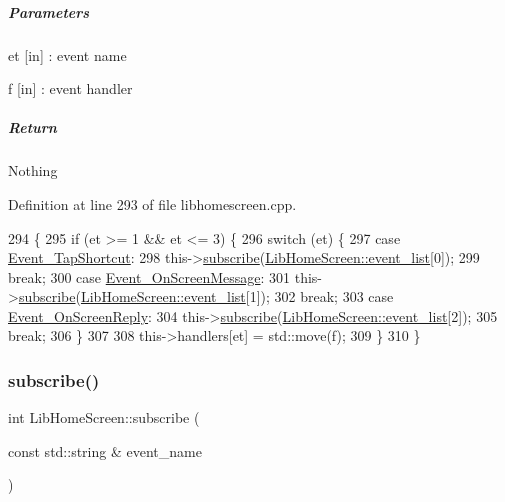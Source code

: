 \subparagraph*{Parameters}


\begin{DoxyItemize}
\item et \mbox{[}in\mbox{]} \+: event name
\item f \mbox{[}in\mbox{]} \+: event handler
\end{DoxyItemize}

\subparagraph*{Return}

Nothing 

Definition at line 293 of file libhomescreen.\+cpp.


\begin{DoxyCode}
294 \{
295     \textcolor{keywordflow}{if} (et >= 1 && et <= 3) \{
296         \textcolor{keywordflow}{switch} (et) \{
297             \textcolor{keywordflow}{case} \hyperlink{class_lib_home_screen_a82616c91ac211d2ad08e709b524bf154a4b0a82d501e4db5fbfe25c254c92896f}{Event\_TapShortcut}:
298                 this->\hyperlink{class_lib_home_screen_aa4c189807b75d070f567967f0d690738}{subscribe}(\hyperlink{class_lib_home_screen_a6a6d8a4d33a006a08652e7377a4c29e9}{LibHomeScreen::event\_list}[0]);
299                 \textcolor{keywordflow}{break};
300             \textcolor{keywordflow}{case} \hyperlink{class_lib_home_screen_a82616c91ac211d2ad08e709b524bf154aea56fa32a124a8ddcbea127755280a1d}{Event\_OnScreenMessage}:
301                 this->\hyperlink{class_lib_home_screen_aa4c189807b75d070f567967f0d690738}{subscribe}(\hyperlink{class_lib_home_screen_a6a6d8a4d33a006a08652e7377a4c29e9}{LibHomeScreen::event\_list}[1]);
302                 \textcolor{keywordflow}{break};
303             \textcolor{keywordflow}{case} \hyperlink{class_lib_home_screen_a82616c91ac211d2ad08e709b524bf154acae91db4efc2394fd701f581d277a3fd}{Event\_OnScreenReply}:
304                 this->\hyperlink{class_lib_home_screen_aa4c189807b75d070f567967f0d690738}{subscribe}(\hyperlink{class_lib_home_screen_a6a6d8a4d33a006a08652e7377a4c29e9}{LibHomeScreen::event\_list}[2]);
305                 \textcolor{keywordflow}{break};
306         \}
307 
308         this->handlers[et] = std::move(f);
309     \}
310 \}
\end{DoxyCode}
\mbox{\label{class_lib_home_screen_aa4c189807b75d070f567967f0d690738}} 
\subsubsection{\texorpdfstring{subscribe()}{subscribe()}}
{\footnotesize\ttfamily int Lib\+Home\+Screen\+::subscribe (\begin{DoxyParamCaption}\item[{const std\+::string \&}]{event\+\_\+name }\end{DoxyParamCaption})}

